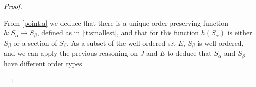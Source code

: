 \documentclass[11pt,a4paper,twoside]{article}
\theoremstyle{definition}
\begin{document}
\begin{proof}
\begin{enumerate}[(a)]
    From \cref{point:a} we deduce that there is a unique order-preserving function $h : S_\alpha \to S_\beta$, defined as in
    \ref{it:smallest}, and that for this function $h ( S_\alpha )$ is either $S_\beta$ or a section of $S_\beta$.
    As a subset of the well-ordered set $E$, $S_\beta$ is well-ordered, and we can apply the previous reasoning on $J$
    and $E$ to deduce that $S_\alpha$ and $S_\beta$ have different order types.\qedhere

  \end{enumerate}

\end{proof}
\end{document}
